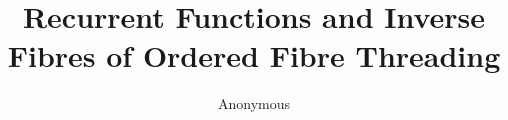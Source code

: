 \documentclass[a4paper,10pt]{amsart}
\title[Ordered fibre threading]{Recurrent Functions and Inverse Fibres of Ordered Fibre Threading}
\author{Anonymous}
\date{}
\begin{document}
\begin{abstract}

\end{abstract}
\maketitle






\end{document}
